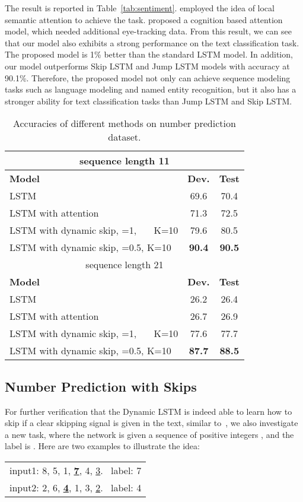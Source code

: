 \documentclass[letterpaper]{article} \usepackage{aaai19}  \usepackage{times}  \usepackage{helvet}  \usepackage{courier}  \usepackage{url}  \usepackage{graphicx}  \usepackage{amsmath}
\begin{document}
The result is reported in Table~\ref{tab:sentiment}. \cite{chen2016neural} employed the idea of local semantic attention to achieve the task. \cite{long2017cognition} proposed a cognition based attention model, which needed additional eye-tracking data. From this result, we can see that our model also exhibits a strong performance on the text classification task. The proposed model is 1\% better than the standard LSTM model. In addition, our model outperforms Skip LSTM and Jump LSTM models with accuracy at 90.1\%. Therefore, the proposed model not only can achieve sequence modeling tasks such as language modeling and named entity recognition, but it also has a stronger ability for text classification tasks than Jump LSTM and Skip LSTM.




\begin{table}[t]
\centering
\begin{tabular}{|l|c|c|}
\hline
  \multicolumn{3}{|c|}{sequence length 11}\\
  \hline
  \textbf{Model}  & \textbf{Dev.} & \textbf{Test}\\
  \hline
  LSTM & 69.6 & 70.4\\
  LSTM with attention & 71.3 & 72.5\\
  LSTM with dynamic skip, =1, \ \ \ K=10 & 79.6 & 80.5\\
  LSTM with dynamic skip, =0.5, K=10 & \textbf{90.4} & \textbf{90.5}\\
  \hline
  \multicolumn{3}{|c|}{sequence length 21}\\
  \hline
  \textbf{Model}  & \textbf{Dev.} & \textbf{Test}\\
  \hline
  LSTM & 26.2 & 26.4\\
  LSTM with attention & 26.7 & 26.9\\
  LSTM with dynamic skip, =1, \ \ \ K=10 & 77.6 & 77.7\\
  LSTM with dynamic skip, =0.5, K=10 & \textbf{87.7} & \textbf{88.5}\\
  \hline
\end{tabular}
\caption{Accuracies of different methods on number prediction dataset.}
  \label{tab:number}
\end{table}

\subsection{Number Prediction with Skips}
For further verification that the Dynamic LSTM is indeed able to learn how to skip if a clear skipping signal is given in the text, similar to~\cite{yu2017learning}, we also investigate a new task, where the network is given a sequence of  positive integers , and the label is . Here are two examples to illustrate the idea:
\begin{table}[h]
\centering
\begin{tabular}{c}
  input1: 8, 5, 1, \textbf{\underline7}, 4, \underline3. \ label: 7\\
  input2: 2, 6, \textbf{\underline4}, 1, 3, \underline2. \ label: 4
\end{tabular}
\end{table}
\end{document}

